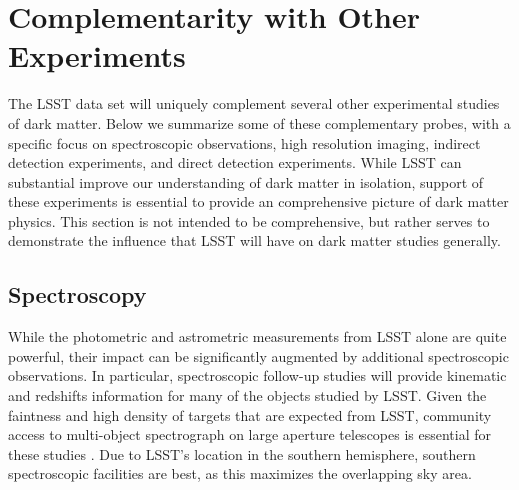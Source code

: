 \chapter{Complementarity with Other Experiments}
\label{sec:complementarity}
\bigskip

The LSST data set will uniquely complement several other experimental studies of dark matter.
Below we summarize some of these complementary probes, with a specific focus on spectroscopic observations, high resolution imaging, indirect detection experiments, and direct detection experiments.
While LSST can substantial improve our understanding of dark matter in isolation, support of these experiments is essential to provide an comprehensive picture of dark matter physics.
This section is not intended to be comprehensive, but rather serves to demonstrate the influence that LSST will have on dark matter studies generally.

\section{Spectroscopy }
 \label{sec:spectroscopy}


While the photometric and astrometric measurements from LSST alone are quite powerful, their impact can be significantly augmented by additional spectroscopic observations. 
In particular, spectroscopic follow-up studies will provide kinematic and redshifts information for many of the objects studied by LSST.
Given the faintness and high density of targets that are expected from LSST, community access to multi-object spectrograph on large aperture telescopes is essential for these studies \citep{2016arXiv161001661N}. 
Due to LSST's location in the southern hemisphere, southern spectroscopic facilities are best, as this  maximizes the overlapping sky area.

